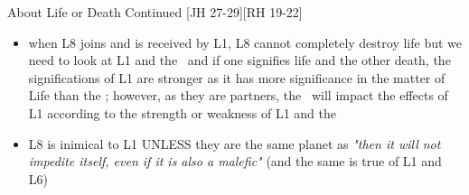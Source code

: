 \begin{frame}[t]{About Life or Death Continued [JH 27-29][RH 19-22]}
\begin{itemize}
\item when L8 joins and is received by L1, L8 cannot completely destroy life but we need to look at L1 and the \Moon\ and if one signifies life and the other death, the significations of L1 are stronger as it has more significance in the matter of Life than the \Moon; however, as they are partners, the \Moon\ will impact the effects of L1 according to the strength or weakness of L1 and the \Moon

\item L8 is inimical to L1 UNLESS they are the same planet as \textsl{"then it will not impedite itself, even if it is also a malefic"} (and the same is true of L1 and L6)
\end{itemize}

\end{frame}
